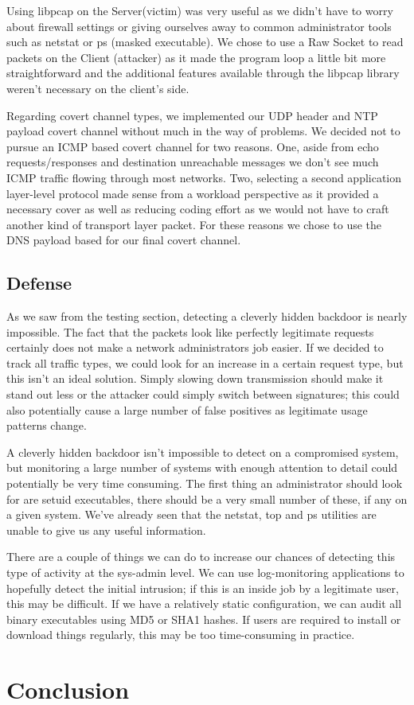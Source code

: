 \documentclass[titlepage]{article}
\begin{document}
Using libpcap on the Server(victim) was very useful as we didn't have to worry about firewall settings or giving ourselves away to common administrator tools such as netstat or ps (masked executable).  We chose to use a Raw Socket to read packets on the Client (attacker) as it made the program loop a little bit more straightforward and the additional features available through the libpcap library weren't necessary on the client's side.

Regarding covert channel types, we implemented our UDP header and NTP payload covert channel without much in the way of problems.  We decided not to pursue an ICMP based covert channel for two reasons. One, aside from echo requests/responses and destination unreachable messages we don't see much ICMP traffic flowing through most networks. Two, selecting a second application layer-level protocol made sense from a workload perspective as it provided a necessary cover as well as reducing coding effort as we would not have to craft another kind of transport layer packet.  For these reasons we chose to use the DNS payload based for our final covert channel.

\subsection{Defense}

As we saw from the testing section, detecting a cleverly hidden backdoor is nearly impossible.  The fact that the packets look like perfectly legitimate requests certainly does not make a network administrators job easier. If we decided to track all traffic types, we could look for an increase in a certain request type, but this isn't an ideal solution. Simply slowing down transmission should make it stand out less or the attacker could simply switch between signatures; this could also potentially cause a large number of false positives as legitimate usage patterns change.

A cleverly hidden backdoor isn't impossible to detect on a compromised system, but monitoring a large number of systems with enough attention to detail could potentially be very time consuming.  The first thing an administrator should look for are setuid executables, there should be a very small number of these, if any on a given system.  We've already seen that the netstat, top and ps utilities are unable to give us any useful information. 

There are a couple of things we can do to increase our chances of detecting this type of activity at the sys-admin level. We can use log-monitoring applications to hopefully detect the initial intrusion; if this is an inside job by a legitimate user, this may be difficult.  If we have a relatively static configuration, we can audit all binary executables using MD5 or SHA1 hashes. If users are required to install or download things regularly, this may be too time-consuming in practice.

\section{Conclusion}
\end{document}
